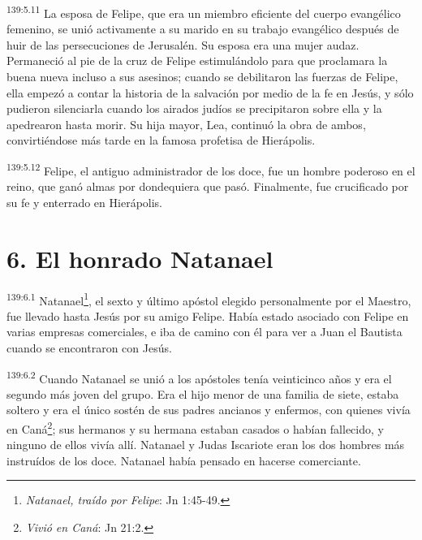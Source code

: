 \par 
\textsuperscript{139:5.11} La esposa de Felipe, que era un miembro eficiente del cuerpo evangélico femenino, se unió activamente a su marido en su trabajo evangélico después de huir de las persecuciones de Jerusalén. Su esposa era una mujer audaz. Permaneció al pie de la cruz de Felipe estimulándolo para que proclamara la buena nueva incluso a sus asesinos; cuando se debilitaron las fuerzas de Felipe, ella empezó a contar la historia de la salvación por medio de la fe en Jesús, y sólo pudieron silenciarla cuando los airados judíos se precipitaron sobre ella y la apedrearon hasta morir. Su hija mayor, Lea, continuó la obra de ambos, convirtiéndose más tarde en la famosa profetisa de Hierápolis.

\par 
\textsuperscript{139:5.12} Felipe, el antiguo administrador de los doce, fue un hombre poderoso en el reino, que ganó almas por dondequiera que pasó. Finalmente, fue crucificado por su fe y enterrado en Hierápolis.

\section*{6. El honrado Natanael}
\par 
\textsuperscript{139:6.1} Natanael\footnote{\textit{Natanael, traído por Felipe}: Jn 1:45-49.}, el sexto y último apóstol elegido personalmente por el Maestro, fue llevado hasta Jesús por su amigo Felipe. Había estado asociado con Felipe en varias empresas comerciales, e iba de camino con él para ver a Juan el Bautista cuando se encontraron con Jesús.

\par 
\textsuperscript{139:6.2} Cuando Natanael se unió a los apóstoles tenía veinticinco años y era el segundo más joven del grupo. Era el hijo menor de una familia de siete, estaba soltero y era el único sostén de sus padres ancianos y enfermos, con quienes vivía en Caná\footnote{\textit{Vivió en Caná}: Jn 21:2.}; sus hermanos y su hermana estaban casados o habían fallecido, y ninguno de ellos vivía allí. Natanael y Judas Iscariote eran los dos hombres más instruídos de los doce. Natanael había pensado en hacerse comerciante.

